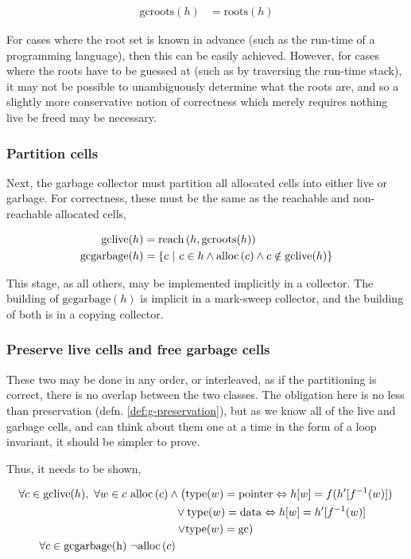 \begin{align*}
  \mathrm{gcroots}(h) &= \mathrm{roots}(h)
\end{align*}

For cases where the root set is known in advance (such as the run-time
of a programming language), then this can be easily achieved. However,
for cases where the roots have to be guessed at (such as by traversing
the run-time stack), it may not be possible to unambiguously determine
what the roots are, and so a slightly more conservative notion of
correctness which merely requires nothing live be freed may be
necessary.

\subsubsection{Partition cells}
\label{sec:gc-framework-obligations-partition}

Next, the garbage collector must partition all allocated cells into
either live or garbage. For correctness, these must be the same as the
reachable and non-reachable allocated cells,

\begin{align*}
  \mathrm{gclive}(h) &= \mathrm{reach}\left(h, \mathrm{gcroots}(h)\right)\\
  \mathrm{gcgarbage}(h) &= \left\{c~|~c \in h \land \mathrm{alloc}\left(c\right) \land c
    \notin \mathrm{gclive}(h)\right\}
\end{align*}

This stage, as all others, may be implemented implicitly in a
collector. The building of $\mathrm{gcgarbage}(h)$ is implicit in a
mark-sweep collector, and the building of both is in a copying
collector.

\subsubsection{Preserve live cells and free garbage cells}
\label{sec:gc-framework-obligations-collect}

These two may be done in any order, or interleaved, as if the
partitioning is correct, there is no overlap between the two
classes. The obligation here is no less than preservation
(defn. \ref{def:g-preservation}), but as we know all of the live and
garbage cells, and can think about them one at a time in the form of a
loop invariant, it should be simpler to prove.

Thus, it needs to be shown,

\begin{align*}
  \forall c \in \mathrm{gclive}(h),\ \forall w \in c\ & \mathrm{alloc}\left(c\right) \land 
  \left(\mathrm{type}(w) = \mathrm{pointer} \Leftrightarrow h[w] =
    f(h'[f^{-1}(w)])\right.\\
  &\quad\quad\quad\quad \lor \mathrm{type}(w) = \mathrm{data}
  \Leftrightarrow h[w] = h'[f^{-1}(w)]\\
  &\quad\quad\quad\quad \left.\lor \mathrm{type}(w) =
    \mathrm{gc}\right)\\
  \forall c \in \mathrm{gcgarbage(h)}\ & \lnot \mathrm{alloc}\left(c\right)
\end{align*}

